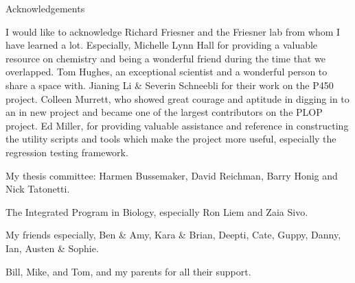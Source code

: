 {\centering
\LARGE
Acknowledgements
\par
}

I would like to acknowledge Richard Friesner and the Friesner lab from whom I have learned a lot.
Especially, Michelle Lynn Hall for providing a valuable resource on chemistry and being a wonderful friend during the time that we overlapped.
Tom Hughes, an exceptional scientist and a wonderful person to share a space with.
Jianing Li \& Severin Schneebli for their work on the P450 project.
Colleen Murrett, who showed great courage and aptitude in digging in to an in new project and became one of the largest contributors on the PLOP project.
Ed Miller, for providing valuable assistance and reference in constructing the utility scripts and tools which make the project more useful, especially the regression testing framework. 

My thesis committee: Harmen Bussemaker, David Reichman, Barry Honig and Nick Tatonetti.

The Integrated Program in Biology, especially Ron Liem and Zaia Sivo.

My friends especially, Ben \& Amy, Kara \& Brian, Deepti, Cate, Guppy, Danny, Ian, Austen \& Sophie.

Bill, Mike, and Tom, and my parents for all their support.

